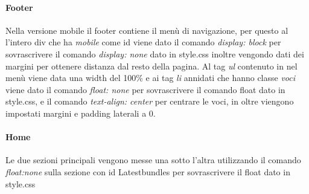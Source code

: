 \paragraph{Footer} \mbox{}
Nella versione mobile il footer contiene il menù di navigazione, per questo al l'intero div che ha \emph{mobile} come id viene dato il comando \emph{display: block} per sovrascrivere il comando \emph{display: none} dato in style.css inoltre vengondo dati dei margini per ottenere distanza dal resto della pagina.
Al tag \emph{ul} contenuto in nel menù viene data una width del 100\% e ai tag \emph{li} annidati che hanno classe \emph{voci} viene dato il comando \emph{float: none} per sovrascrivere il comando float dato in style.css, e il comando \emph{text-align: center} per centrare le voci, in oltre viengono impostati margini e padding laterali a 0.

\paragraph{Home} \mbox{}
Le due sezioni principali vengono messe una sotto l'altra utilizzando il comando \emph{float:none} sulla sezione con id Latestbundles per sovrascrivere il float dato in style.css


